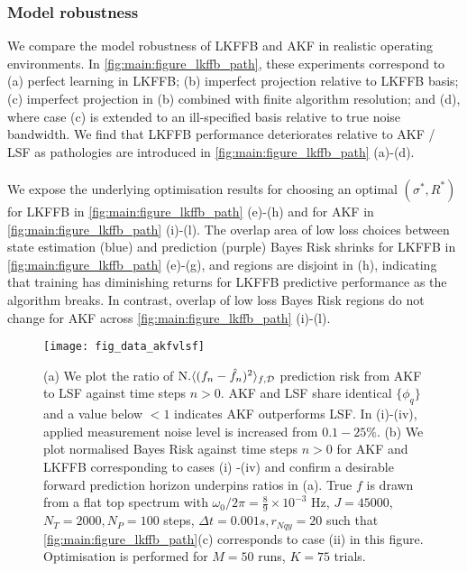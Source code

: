 \documentclass[pra, reprint]{revtex4-1}
\begin{document}
\subsubsection{Model robustness}
We compare the model robustness of LKFFB and AKF in realistic operating environments. In \cref{fig:main:figure_lkffb_path}, these experiments correspond to (a) perfect learning in LKFFB; (b) imperfect projection relative to LKFFB basis; (c) imperfect projection in (b) combined with finite algorithm resolution; and (d), where case (c)  is extended to an ill-specified basis relative to true noise bandwidth. We find that LKFFB performance deteriorates relative to AKF / LSF as pathologies are introduced in \cref{fig:main:figure_lkffb_path} (a)-(d). 
\\
\\
We expose the underlying optimisation results for choosing an optimal $(\sigma^*, R^*)$ for LKFFB in \cref{fig:main:figure_lkffb_path} (e)-(h) and for AKF in \cref{fig:main:figure_lkffb_path} (i)-(l). The overlap area of low loss choices between state estimation (blue) and prediction (purple) Bayes Risk shrinks for LKFFB in \cref{fig:main:figure_lkffb_path} (e)-(g), and regions are disjoint in (h), indicating that training has diminishing returns for LKFFB predictive performance as the algorithm breaks. In contrast, overlap of low loss Bayes Risk regions do not change for AKF across \cref{fig:main:figure_lkffb_path} (i)-(l).

\begin{figure}
    \texttt{[image: fig\_data\_akfvlsf]}
    \caption{\label{fig:main:fig_data_akfvlsf} (a) We plot the ratio of $\text{N.} \langle (f_n - \hat{f}_n)^2 \rangle_{f, \mathcal{D}}$ prediction risk from AKF to LSF against time steps $n>0$.  AKF and LSF share identical $\{ \phi_q \}$ and  a value below $<1$ indicates AKF outperforms LSF. In (i)-(iv), applied measurement noise level is increased from $0.1 - 25 \%$. (b) We plot normalised Bayes Risk against time steps $n>0$ for AKF and LKFFB corresponding to cases (i) -(iv) and confirm a desirable forward prediction horizon underpins ratios in (a). True $f$ is drawn from a flat top spectrum with $\omega_0 / 2\pi = \frac{8}{9} \times 10^{-3}$ Hz, $J = 45000$, $N_T = 2000, N_P = 100$ steps, $\Delta t = 0.001s, r_{Nqy}=20$ such that \cref{fig:main:figure_lkffb_path}(c) corresponds to case (ii) in this figure. Optimisation is performed for $M=50$ runs, $K=75$ trials.}
\end{figure}
\end{document}
